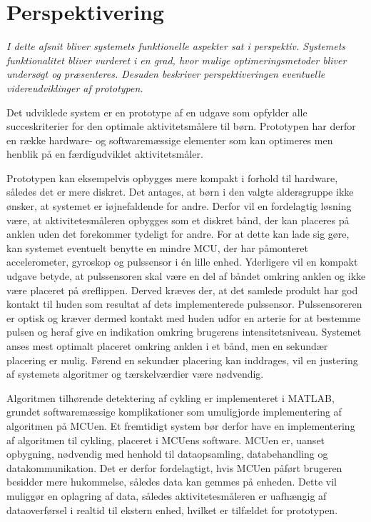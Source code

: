 \section{Perspektivering}\label{sec:perspektivering}
\textit{I dette afsnit bliver systemets funktionelle aspekter sat i perspektiv. Systemets funktionalitet bliver vurderet i en grad, hvor mulige optimeringsmetoder bliver undersøgt og præsenteres. Desuden beskriver perspektiveringen eventuelle videreudviklinger af prototypen.}

Det udviklede system er en prototype af en udgave som opfylder alle succeskriterier for den optimale aktivitetsmålere til børn. Prototypen har derfor en række hardware- og softwaremæssige elementer som kan optimeres men henblik på en færdigudviklet aktivitetsmåler.

Prototypen kan eksempelvis opbygges mere kompakt i forhold til hardware, således det er mere diskret. Det antages, at børn i den valgte aldersgruppe ikke ønsker, at systemet er iøjnefaldende for andre. Derfor vil en fordelagtig løsning være, at aktivitetesmåleren opbygges som et diskret bånd, der kan placeres på anklen uden det forekommer tydeligt for andre. For at dette kan lade sig gøre, kan systemet eventuelt benytte en mindre MCU, der har påmonteret accelerometer, gyroskop og pulssensor i én lille enhed. Yderligere vil en kompakt udgave betyde, at pulssensoren skal være en del af båndet omkring anklen og ikke være placeret på øreflippen. Derved kræves der, at det samlede produkt har god kontakt til huden som resultat af dets implementerede pulssensor. Pulssensoreren er optisk og kræver dermed kontakt med huden udfor en arterie for at bestemme pulsen og heraf give en indikation omkring brugerens intensitetsniveau. Systemet anses mest optimalt placeret omkring anklen i et bånd, men en sekundær placering er mulig. Førend en sekundær placering kan inddrages, vil en justering af systemets algoritmer og tærskelværdier være nødvendig. 

Algoritmen tilhørende detektering af cykling er implementeret i MATLAB, grundet softwaremæssige komplikationer som umuligjorde implementering af algoritmen på MCUen. Et fremtidigt system bør derfor have en implementering af algoritmen til cykling, placeret i MCUens software. MCUen er, uanset opbygning, nødvendig med henhold til dataopsamling, databehandling og datakommunikation. Det er derfor fordelagtigt, hvis MCUen påført brugeren besidder mere hukommelse, således data kan gemmes på enheden. Dette vil muliggør en oplagring af data, således aktivitetesmåleren er uafhængig af dataoverførsel i realtid til ekstern enhed, hvilket er tilfældet for prototypen. 

